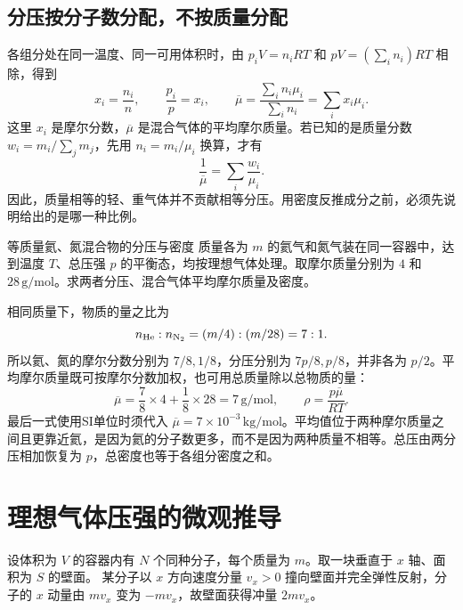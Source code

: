 {\subsection{分压按分子数分配，不按质量分配}
各组分处在同一温度、同一可用体积时，由 $p_iV=n_iRT$ 和 $pV=(\sum_i n_i)RT$ 相除，得到
\[
 x_i=\frac{n_i}{n},\qquad \frac{p_i}{p}=x_i,\qquad
 \overline\mu=\frac{\sum_i n_i\mu_i}{\sum_i n_i}=\sum_i x_i\mu_i.
\]
这里 $x_i$ 是摩尔分数，$\overline\mu$ 是混合气体的平均摩尔质量。若已知的是质量分数 $w_i=m_i/\sum_jm_j$，先用 $n_i=m_i/\mu_i$ 换算，才有
\[
 \frac1{\overline\mu}=\sum_i\frac{w_i}{\mu_i}.
\]
因此，质量相等的轻、重气体并不贡献相等分压。用密度反推成分之前，必须先说明给出的是哪一种比例。




\Needspace{180pt}
\begin{origexamplebox}{等质量氦、氮混合物的分压与密度}\label{ch14:ex:teaching-mixture}
质量各为 $m$ 的氦气和氮气装在同一容器中，达到温度 $T$、总压强 $p$ 的平衡态，均按理想气体处理。取摩尔质量分别为 $4$ 和 $28\,\mathrm{g/mol}$。求两者分压、混合气体平均摩尔质量及密度。

\ThQMixture
\end{origexamplebox}
\Needspace{65pt}
\begin{xesolution}
\ThAMixture

相同质量下，物质的量之比为
\[
 n_{\rm He}:n_{\rm N_2}=(m/4):(m/28)=7:1.
\]
所以氦、氮的摩尔分数分别为 $7/8,1/8$，分压分别为 $7p/8,p/8$，并非各为 $p/2$。平均摩尔质量既可按摩尔分数加权，也可用总质量除以总物质的量：
\[
 \overline\mu=\frac78\times4+\frac18\times28
 =7\,\mathrm{g/mol},\qquad
 \rho=\frac{p\overline\mu}{RT}.
\]
最后一式使用SI单位时须代入 $\overline\mu=7\times10^{-3}\,\mathrm{kg/mol}$。平均值位于两种摩尔质量之间且更靠近氦，是因为氦的分子数更多，而不是因为两种质量不相等。总压由两分压相加恢复为 $p$，总密度也等于各组分密度之和。
\end{xesolution}

\section{理想气体压强的微观推导}\label{ch14:sec:pressure}

设体积为 $V$ 的容器内有 $N$ 个同种分子，每个质量为 $m$。取一块垂直于 $x$ 轴、面积为 $S$ 的壁面。
某分子以 $x$ 方向速度分量 $v_x>0$ 撞向壁面并完全弹性反射，分子的 $x$ 动量由 $mv_x$ 变为
$-mv_x$，故壁面获得冲量 $2mv_x$。

\figureNineteenSixFaithful

}
